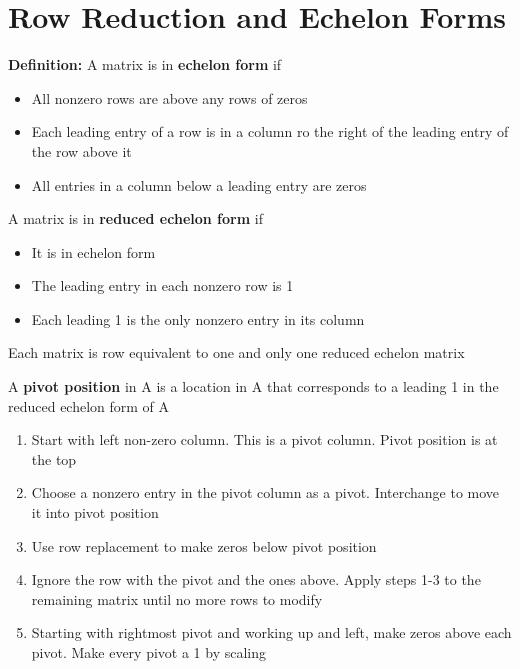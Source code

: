 \documentclass{report}
\begin{document}
\section{Row Reduction and Echelon Forms}
\textbf{Definition:} A matrix is in \textbf{echelon form} if
\begin{itemize}
    \item All nonzero rows are above any rows of zeros
    \item Each leading entry of a row is in a column ro the right of the leading entry of the row above it
    \item All entries in a column below a leading entry are zeros
\end{itemize}
A matrix is in \textbf{reduced echelon form} if
\begin{itemize}
    \item It is in echelon form
    \item The leading entry in each nonzero row is 1
    \item Each leading 1 is the only nonzero entry in its column
\end{itemize}
\begin{theorem}
    Each matrix is row equivalent to one and only one reduced echelon matrix
\end{theorem}
\begin{definition}
    A \textbf{pivot position} in A is a location in A that corresponds to a leading 1
    in the reduced echelon form of A
\end{definition}
\begin{tcolorbox}[colback=blue!5!white, colframe=blue!75!black, title=Row Reduction Algorithm]
\begin{enumerate}
    \item Start with left non-zero column. This is a pivot column. Pivot position is at the top
    \item Choose a nonzero entry in the pivot column as a pivot. Interchange to move it into pivot position
    \item Use row replacement to make zeros below pivot position
    \item Ignore the row with the pivot and the ones above. Apply steps 1-3 to the remaining matrix until no more rows to modify
    \item Starting with rightmost pivot and working up and left, make zeros above each pivot. Make every pivot a 1 by scaling
\end{enumerate}
\end{tcolorbox}
\end{document}

